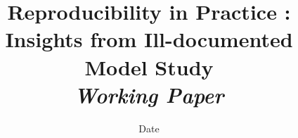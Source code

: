 


\title{Reproducibility in Practice : Insights from Ill-documented Model Study\bigskip\\
\textit{Working Paper}
}
\author{}
\date{Date}


\maketitle

\begin{abstract}

\end{abstract}






















